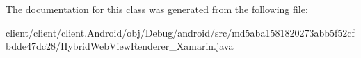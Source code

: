 The documentation for this class was generated from the following file\+:\begin{DoxyCompactItemize}
\item 
client/client/client.\+Android/obj/\+Debug/android/src/md5aba1581820273abb5f52cfbdde47dc28/Hybrid\+Web\+View\+Renderer\+\_\+\+Xamarin.\+java\end{DoxyCompactItemize}
